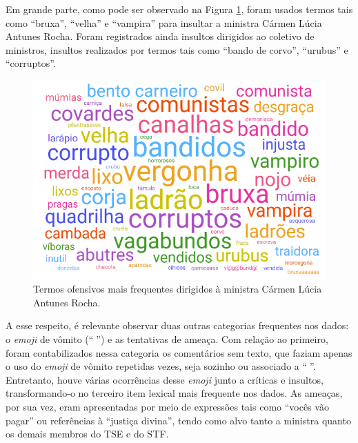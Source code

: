 \documentclass[portuguese]{textolivre}
\begin{document}
Em grande parte, como pode ser observado na Figura \ref{fig-3}, foram usados termos tais como ``bruxa'', ``velha'' e ``vampira'' para insultar a ministra Cármen Lúcia Antunes Rocha. Foram registrados ainda insultos dirigidos ao coletivo de ministros, insultos realizados por termos tais como ``bando de corvo'', ``urubus'' e ``corruptos''.

\begin{figure}[h!]
\centering
\begin{minipage}{.60\textwidth}
\includegraphics[width=\textwidth ]{Fig8.png}
\caption{Termos ofensivos mais frequentes dirigidos à ministra Cármen Lúcia Antunes Rocha.}
\label{fig-3}
\end{minipage}
\end{figure}

A esse respeito, é relevante observar duas outras categorias frequentes nos dados: o \textit{emoji} de vômito (``{\Symbola 🤮}'') e as tentativas de ameaça. Com relação ao primeiro, foram contabilizados nessa categoria os comentários sem texto, que faziam apenas o uso do \textit{emoji} de vômito repetidas vezes, seja sozinho ou associado a ``{\Symbola 🤢}''. Entretanto, houve várias ocorrências desse \textit{emoji} junto a críticas e insultos, transformando-o no terceiro item lexical mais frequente nos dados. As ameaças, por sua vez, eram apresentadas por meio de expressões tais como ``vocês vão pagar'' ou referências à ``justiça divina'', tendo como alvo tanto a ministra quanto os demais membros do TSE e do STF.
\end{document}
